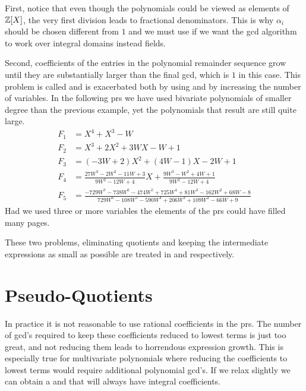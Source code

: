 First, notice that even though the polynomials could be viewed as elements of
$\mathbb{Z}[X]$, the very first division leads to fractional denominators.
This is why $\alpha_i$ should be chosen different from $1$ and we must
use  if we want the {\sc gcd}  algorithm to work over
integral domains instead fields.

Second, coefficients of the entries in the polynomial remainder
sequence grow until they are substantially larger than the final {\sc gcd},
which is $1$ in this case.  This problem is called  and is exacerbated both by using 
and by increasing the number of variables. In the following {\sc prs} we
have used bivariate polynomials of smaller degree than the previous
example, yet the polynomials that result are still quite large.
\[
\begin{aligned}
  F_{1} & = X^4 + X^3 - W\\
  F_{2} & = X^3 +2X^2 +3WX - W +1\\
  F_{3} & = (-3W +2)X^2 + (4W-1)X -2W + 1 \\
  F_{4} & = \frac{27 W^3 -2W^2 -11W +3}{9W^2 -12W +4} X 
            + \frac{9W^3-W^2+4W+1}{9W^2-12W +4}\\
  F_{5} & = \frac{-729 W^7  - 738 W^6 -474W^5 +725W^4
                   + 81W^3 -162W^2 +68W-8}{ 729W^6 -108W^5 
                   - 590W^4 +206W^3 +109W^2-66W+9}
\end{aligned}
\]
Had we used three or more variables the elements of the {\sc prs} could have
filled many pages.

These two problems, eliminating quotients and keeping the intermediate
expressions as small as possible are treated in
 and  respectively. 

\section{Pseudo-Quotients}
\label{PRS:Quotient:Sec}

In practice it is not reasonable to use rational coefficients in the
{\sc prs}.  The number of {\sc gcd}'s required to keep these
coefficients reduced to lowest terms is just too great, and not
reducing them leads to horrendous expression growth.  This is
especially true for multivariate polynomials where reducing the
coefficients to lowest terms would require additional polynomial {\sc
gcd}'s.  If we relax  slightly we can obtain
a  and  that will always
have integral coefficients.

